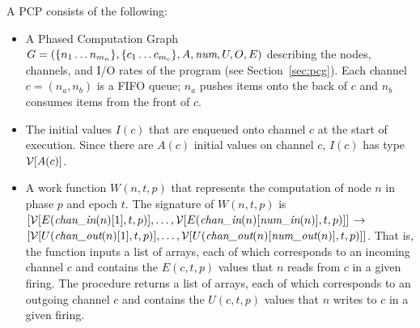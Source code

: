 A PCP consists of the following:
\begin{itemize}

\item A Phased Computation Graph $G = (\{n_1 \dots n_{m_n}\}, \{c_1
\dots c_{m_c}\}, A, \mbox{\it num}, U, O, E)$ describing the nodes,
channels, and I/O rates of the program (see Section~\ref{sec:pcg}).
Each channel $c = (n_a, n_b)$ is a FIFO queue; $n_a$ pushes items onto
the back of $c$ and $n_b$ consumes items from the front of $c$.

\item The initial values $I(c)$ that are enqueued onto channel $c$ at
the start of execution.  Since there are $A(c)$ initial values on
channel $c$, $I(c)$ has type ${\cal V}[A(c)]$.

%
\item A work function $W(n, t, p)$ that represents the computation of
node $n$ in phase $p$ and epoch $t$.  The signature of $W(n, t, p)$ is
$[{\cal V}[E(\mbox{\it chan\_in}(n)[1], t, p)], \dots, {\cal
V}[E(\mbox{\it chan\_in}(n)[\mbox{\it num\_in}(n)], t, p)]]$
${\small \rightarrow}$\\
$[ {\cal
V}[U(\mbox{\it chan\_out}(n)[1], t, p)], \dots, {\cal
V}[U(\mbox{\it chan\_out}(n)[\mbox{\it num\_out}(n)], t, p)]]$.  That is, the function
inputs a list of arrays, each of which corresponds to an incoming
channel $c$ and contains the $E(c,t,p)$ values that $n$ reads from $c$
in a given firing.  The procedure returns a list of arrays, each of
which corresponds to an outgoing channel $c$ and contains the
$U(c,t,p)$ values that $n$ writes to $c$ in a given firing.

\end{itemize}


